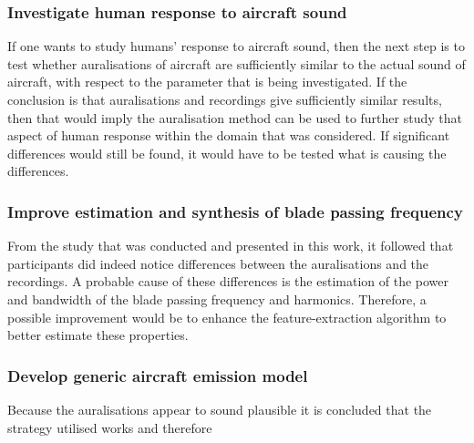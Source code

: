 \subsubsection*{Investigate human response to aircraft sound}
If one wants to study humans' response to aircraft sound, then the next step is
to test whether auralisations of aircraft are sufficiently similar to the actual
sound of aircraft, with respect to the parameter that is being investigated. If
the conclusion is that auralisations and recordings give sufficiently similar
results, then that would imply the auralisation method can be used to further
study that aspect of human response within the domain that was considered. If
significant differences would still be found, it would have to be tested what is
causing the differences.


\subsubsection*{Improve estimation and synthesis of blade passing frequency}
From the study that was conducted and presented in this work, it followed that
participants did indeed notice differences between the auralisations and the
recordings. A probable cause of these differences is the estimation of the
power and bandwidth of the blade passing frequency and harmonics. Therefore, a
possible improvement would be to enhance the feature-extraction algorithm to
better estimate these properties.


\subsubsection*{Develop generic aircraft emission model}
Because the auralisations appear to sound plausible it is concluded that the strategy
utilised works and therefore


